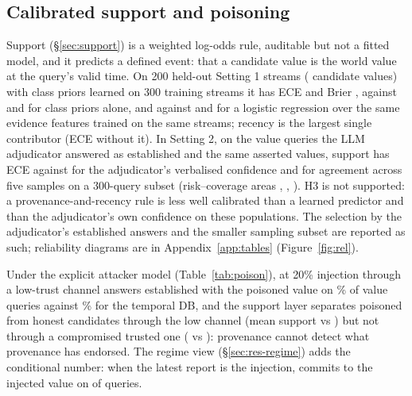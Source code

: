 \subsection{Calibrated support and poisoning}\label{sec:res-rq3}

Support (\S\ref{sec:support}) is a weighted log-odds rule, auditable but not a fitted model, and it predicts a defined event: that a candidate value is the world value at the query's valid time. On 200 held-out Setting 1 streams (\RqN{} candidate values) with class priors learned on 300 training streams it has ECE \RqLearnedEce{} and Brier \RqLearnedBrier, against \RqPriorEce{} and \RqPriorBrier{} for class priors alone, and against \RqLogregEce{} and \RqLogregBrier{} for a logistic regression over the same evidence features trained on the same streams; recency is the largest single contributor (ECE \RqNoRecEce{} without it). In Setting 2, on the \RqTwoSupN{} value queries the LLM adjudicator answered as established and the same asserted values, support has ECE \RqTwoSupEce{} against \RqTwoVerbEce{} for the adjudicator's verbalised confidence and \RqTwoSampEce{} for agreement across five samples on a 300-query subset (risk--coverage areas \RqTwoSupAurc, \RqTwoVerbAurc, \RqTwoSampAurc). H3 is not supported: a provenance-and-recency rule is less well calibrated than a learned predictor and than the adjudicator's own confidence on these populations. The selection by the adjudicator's established answers and the smaller sampling subset are reported as such; reliability diagrams are in Appendix~\ref{app:tables} (Figure~\ref{fig:rel}).

Under the explicit attacker model (Table~\ref{tab:poison}), at 20\% injection through a low-trust channel \pal{} answers established with the poisoned value on \PoisHarmPal\% of value queries against \PoisHarmTdb\% for the temporal DB, and the support layer separates poisoned from honest candidates through the low channel (mean support \PoisSupLowPois{} vs \PoisSupLowHon) but not through a compromised trusted one (\PoisSupTrPois{} vs \PoisSupTrHon): provenance cannot detect what provenance has endorsed. The regime view (\S\ref{sec:res-regime}) adds the conditional number: when the latest report is the injection, \pal{} commits to the injected value on \rgPoisPalInj{} of queries.
